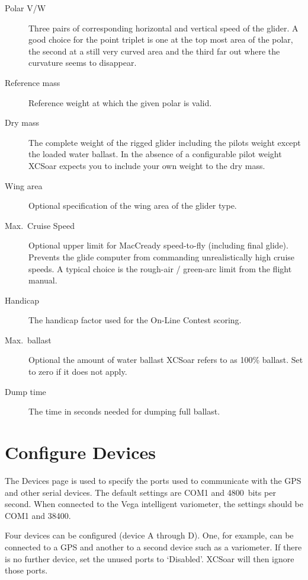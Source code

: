 \begin{description}
\item[Polar V/W]  Three pairs of corresponding horizontal and vertical speed of the glider. 
  A good choice for the point triplet is one at the top most area of the polar, the second at a 
  still very curved area and the third far out where the curvature seems to disappear.
\item[Reference mass]  Reference weight at which the given polar is valid.
\item[Dry mass]  The complete weight of the rigged glider including the pilots weight except the 
  loaded water ballast. 
  In the absence of a configurable pilot weight XCSoar expects you to include your own weight
  to the dry mass.
\item[Wing area]  Optional specification of the wing area of the glider type.
\item[Max.\ Cruise Speed] Optional upper limit for MacCready speed-to-fly
  (including final glide).  Prevents the glide computer from commanding
  unrealistically high cruise speeds.  A typical choice is the rough-air
  / green-arc limit from the flight manual.
\item[Handicap]  The handicap factor used for the On-Line Contest scoring.
\item[Max.\ ballast]  Optional the amount of water ballast XCSoar refers to as 100\% ballast.
  Set to zero if it does not apply.
\item[Dump time]  The time in seconds needed for dumping full ballast.
\end{description}


\section{Configure Devices} \label{conf:comdevices}

The Devices page is used to specify the ports used to communicate with
the GPS and other serial devices. The default settings are COM1 and
4800~bits per second.  When connected to the Vega intelligent
variometer, the settings should be COM1 and 38400.

Four devices can be configured (device A through D). One, for
example, can be connected to a GPS and another to a
second device such as a variometer.  If there is no further device, 
set the unused ports to `Disabled'.  XCSoar will then ignore those ports.

